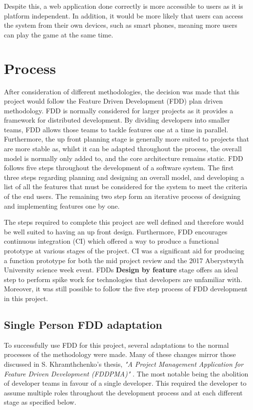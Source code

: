Despite this, a web application done correctly is more accessible to users as it is platform independent. In addition, it would be more likely that users can access the system from their own devices, such as smart phones, meaning more users can play the game at the same time.

\section{Process}
After consideration of different methodologies, the decision was made that this project would follow the Feature Driven Development (FDD) plan driven methodology. FDD is normally considered for larger projects as it provides a framework for distributed development. By dividing developers into smaller teams, FDD allows those teams to tackle features one at a time in parallel. Furthermore, the up front planning stage is generally more suited to projects that are more stable as, whilst it can be adapted throughout the process, the overall model is normally only added to, and the core architecture remains static. FDD follows five steps throughout the development of a software system. The first three steps regarding planning and designing an overall model, and developing a list of all the features that must be considered for the system to meet the criteria of the end users. The remaining two step form an iterative process of designing and implementing features one by one.

The steps required to complete this project are well defined and therefore would be well suited to having an up front design. Furthermore, FDD encourages continuous integration (CI) which offered a way to produce a functional prototype at various stages of the project. CI was a significant aid for producing a function prototype for both the mid project review and the 2017 Aberystwyth University science week event. FDDs \textbf{Design by feature} stage offers an ideal step to perform spike work for technologies that developers are unfamiliar with. Moreover, it was still possible to follow the five step process of FDD development in this project.

\subsection{Single Person FDD adaptation}
To successfully use FDD for this project, several adaptations to the normal processes of the methodology were made. Many of these changes mirror those discussed in S. Khramthchenko's thesis, \textit{"A Project Management Application for Feature Driven Development (FDDPMA)"} \cite{single_person_fdd}. The most notable being the abolition of developer teams in favour of a single developer. This required the developer to assume multiple roles throughout the development process and at each different stage as specified below.

